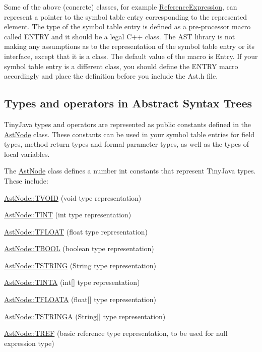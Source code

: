 Some of the above (concrete) classes, for example \hyperlink{classReferenceExpression}{ReferenceExpression}, can represent a pointer to the symbol table entry corresponding to the represented element. The type of the symbol table entry is defined as a pre-\/processor macro called ENTRY and it should be a legal C++ class. The AST library is not making any assumptions as to the representation of the symbol table entry or its interface, except that it is a class. The default value of the macro is Entry. If your symbol table entry is a different class, you should define the ENTRY macro accordingly and place the definition before you include the Ast.h file.\hypertarget{main_TYPES}{}\subsection{Types and operators in Abstract Syntax Trees}\label{main_TYPES}
TinyJava types and operators are represented as public constants defined in the \hyperlink{classAstNode}{AstNode} class. These constants can be used in your symbol table entries for field types, method return types and formal parameter types, as well as the types of local variables.

The \hyperlink{classAstNode}{AstNode} class defines a number int constants that represent TinyJava types. These include:
\begin{DoxyItemize}
\item \hyperlink{classAstNode_ac664e0864b9c856e947d5fde632eb5e7}{AstNode::TVOID} (void type representation)
\item \hyperlink{classAstNode_a8568313f5d280773a446280c94d382f8}{AstNode::TINT} (int type representation)
\item \hyperlink{classAstNode_abf470f775bd7a7bfc2c0610716054339}{AstNode::TFLOAT} (float type representation)
\item \hyperlink{classAstNode_a71904f4c33eff3bb3a37fadda88f12c9}{AstNode::TBOOL} (boolean type representation)
\item \hyperlink{classAstNode_a2245a2aec841592ecddf8f9497306a4b}{AstNode::TSTRING} (String type representation)
\item \hyperlink{classAstNode_a7233043e1a9d95c3120a62ac66c89608}{AstNode::TINTA} (int\mbox{[}\mbox{]} type representation)
\item \hyperlink{classAstNode_a9d01a6ac8a4a7a5b2d4a3ec8a7e93fa7}{AstNode::TFLOATA} (float\mbox{[}\mbox{]} type representation)
\item \hyperlink{classAstNode_ae3a9310b89b8c86afe245cf88ab1369a}{AstNode::TSTRINGA} (String\mbox{[}\mbox{]} type representation)
\item \hyperlink{classAstNode_ad84a595b7727d93d325664d5bf89c766}{AstNode::TREF} (basic reference type representation, to be used for null expression type)
\end{DoxyItemize}


